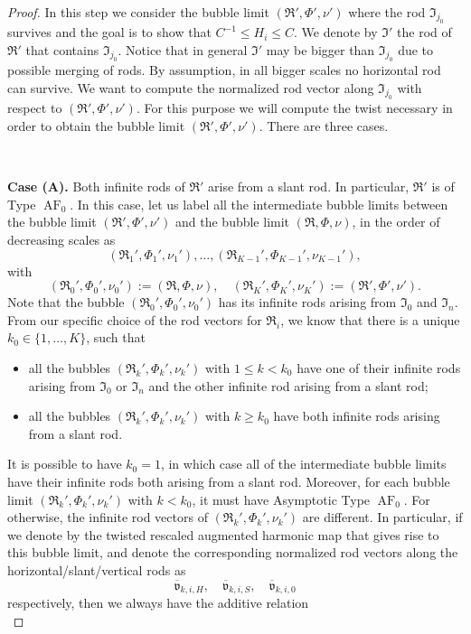 \documentclass[a4paper,11pt]{amsart}
\theoremstyle{definition}
\numberwithin{equation}{section}
\newcommand{\mv} {\mathfrak v}
\newcommand{\mI} {\mathfrak I}
\newcommand{\mR} {\mathfrak R}
\DeclareMathOperator{\AF}{AF}
\begin{document}
\begin{proof}
In this step we consider the bubble limit $(\mR', \Phi',\nu')$ where the rod $\mI_{j_0}$ survives and the goal is to show that $C^{-1}\leq H_i\leq C$.
We denote by $\mI'$ the rod of $\mR'$ that contains $\mI_{j_0}$. Notice that in general $\mI'$ may be bigger than $\mI_{j_0}$ due to possible merging of rods. By assumption, in all bigger scales no horizontal rod can survive.  We want to compute the normalized rod vector  along $\mI_{j_0}$ with respect to  $(\mR',\Phi',\nu')$. For this purpose we will compute the twist necessary in order to obtain the bubble limit $(\mR',\Phi',\nu')$. There are three cases. 

\

{\bf Case (A).} Both infinite rods of $\mR'$ arise from a slant rod. In particular, $\mR'$ is of Type $\AF_0$. In this case, let us label all the intermediate bubble limits between the bubble limit $(\mR', \Phi',\nu')$ and the bubble limit $(\mR, \Phi,\nu)$, in the order of decreasing scales as
$$(\mR_1', \Phi_1',\nu_1'),\ldots, (\mR_{K-1}', \Phi_{K-1}',\nu_{K-1}'),$$
with 
$$(\mR_0', \Phi_0',\nu_0'):=(\mR, \Phi,\nu),\quad (\mR_K', \Phi_K',\nu_K'):=(\mR', \Phi',\nu').$$ 
Note that the bubble $(\mR_0', \Phi_0',\nu_0')$ has its infinite rods arising from $\mI_0$ and $\mI_n$. From our specific choice of the rod vectors for $\mR_i$, we know that there is a unique $k_0\in\{1,\ldots,K\}$, such that 
\begin{itemize}
    \item all the bubbles $(\mR_k', \Phi_k',\nu_k')$ with $1\leq k<k_0$ have one of their infinite rods arising from $\mI_0$ or $\mI_n$ and the other infinite rod arising from a slant rod;
    \item all the bubbles $(\mR_k', \Phi_k',\nu_k')$ with $k\geq k_0$ have both infinite rods arising from a slant rod.
\end{itemize}
It is possible to have $k_0=1$, in which case all of the intermediate bubble limits have their infinite rods both arising from a slant rod. Moreover, for each bubble limit $(\mR_k',\Phi_k',\nu_k')$ with $k<k_0$, it must have Asymptotic Type $\AF_0$. For otherwise, the infinite rod vectors of $(\mR_k',\Phi_k',\nu_k')$  are different. In particular, if we denote  by the twisted rescaled augmented harmonic map that gives rise to this bubble limit, and denote the corresponding normalized rod vectors along the horizontal/slant/vertical rods as
$$\overline{\mv}_{k,i,H},\quad \overline{\mv}_{k,i,S},\quad \overline{\mv}_{k,i,0}$$
respectively, then we always have the additive relation
\begin{equation}\label{eq:additive relation}

\end{equation}
\end{proof}
\end{document}
